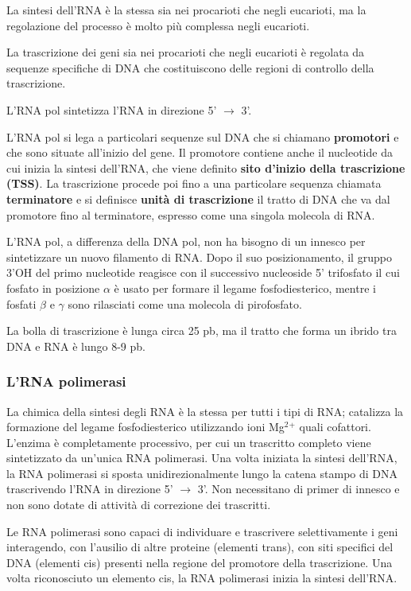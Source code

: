 \documentclass[]{article}
\begin{document}
La sintesi dell'RNA è la stessa sia nei procarioti che negli eucarioti,
ma la regolazione del processo è molto più complessa negli eucarioti.

La trascrizione dei geni sia nei procarioti che negli eucarioti è
regolata da sequenze specifiche di DNA che costituiscono delle regioni
di controllo della trascrizione.

L'RNA pol sintetizza l'RNA in direzione 5' $\rightarrow$ 3'.

L'RNA pol si lega a particolari sequenze sul DNA che si chiamano
\textbf{promotori} e che sono situate all'inizio del gene. Il promotore
contiene anche il nucleotide da cui inizia la sintesi dell'RNA, che
viene definito \textbf{sito d'inizio della trascrizione (TSS)}. La
trascrizione procede poi fino a una particolare sequenza chiamata
\textbf{terminatore} e si definisce \textbf{unità di trascrizione} il
tratto di DNA che va dal promotore fino al terminatore, espresso come
una singola molecola di RNA.

L'RNA pol, a differenza della DNA pol, non ha bisogno di un innesco per
sintetizzare un nuovo filamento di RNA. Dopo il suo posizionamento, il
gruppo 3'OH del primo nucleotide reagisce con il successivo nucleoside
5' trifosfato il cui fosfato in posizione $\alpha$ è usato per formare
il legame fosfodiesterico, mentre i fosfati $\beta$ e $\gamma$ sono
rilasciati come una molecola di pirofosfato.

La bolla di trascrizione è lunga circa 25 pb, ma il tratto che forma un
ibrido tra DNA e RNA è lungo 8-9 pb.

\subsubsection{L'RNA polimerasi}\label{lrna-polimerasi}

La chimica della sintesi degli RNA è la stessa per tutti i tipi di RNA;
catalizza la formazione del legame fosfodiesterico utilizzando ioni
Mg$^2$$^+$ quali cofattori. L'enzima è completamente processivo, per cui
un trascritto completo viene sintetizzato da un'unica RNA polimerasi.
Una volta iniziata la sintesi dell'RNA, la RNA polimerasi si sposta
unidirezionalmente lungo la catena stampo di DNA trascrivendo l'RNA in
direzione 5' $\rightarrow$ 3'. Non necessitano di primer di innesco e
non sono dotate di attività di correzione dei trascritti.

Le RNA polimerasi sono capaci di individuare e trascrivere
selettivamente i geni interagendo, con l'ausilio di altre proteine
(elementi trans), con siti specifici del DNA (elementi cis) presenti
nella regione del promotore della trascrizione. Una volta riconosciuto
un elemento cis, la RNA polimerasi inizia la sintesi dell'RNA.
\end{document}
